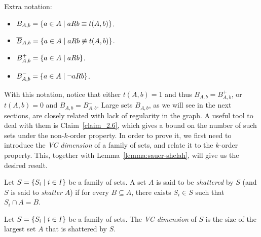     Extra notation:
    \begin{itemize}
        \item $B_{A,b} = \left\{ a \in A \mid a R b \equiv t(A,b) \right\}$.
        \item $\overline{B}_{A,b} = \left\{ a \in A \mid a R b \not\equiv t(A,b) \right\}$.
        \item $B^+_{A,b} = \left\{ a \in A \mid a R b \right\}$.
        \item $B^-_{A,b} = \left\{ a \in A \mid \neg a R b \right\}$.
    \end{itemize}
    With this notation, notice that either $t(A,b) = 1$ and thus $B_{A,b} = B^+_{A,b}$, or $t(A,b) = 0$ and $B_{A,b} = B^-_{A,b}$.
    Large sets $B_{A,b}$, as we will see in the next sections, are closely related with lack of regularity in the graph.
    A useful tool to deal with them is Claim~\ref{claim_2.6}, which gives a bound on the number of such sets under the
    non-$k$-order property.
    In order to prove it, we first need to introduce the \emph{VC dimension} of a family of sets, and relate it to the
    $k$-order property.
    This, together with Lemma~\ref{lemma:sauer-shelah}, will give us the desired result.

    \begin{definition} \label{def:shattered}
        Let $S = \left\{ S_i \mid i \in I \right\}$ be a family of sets.
        A set $A$ is said to be \emph{shattered} by $S$ (and $S$ is said to \emph{shatter} $A$) if
        for every $B \subseteq A$, there exists $S_i \in S$ such that $S_i \cap A = B$.
    \end{definition}

    \begin{definition} \label{def:VC_dimension}
        Let $S = \left\{ S_i \mid i \in I \right\}$ be a family of sets.
        The \emph{VC dimension} of $S$ is the size of the largest set $A$ that is shattered by $S$.
    \end{definition}

